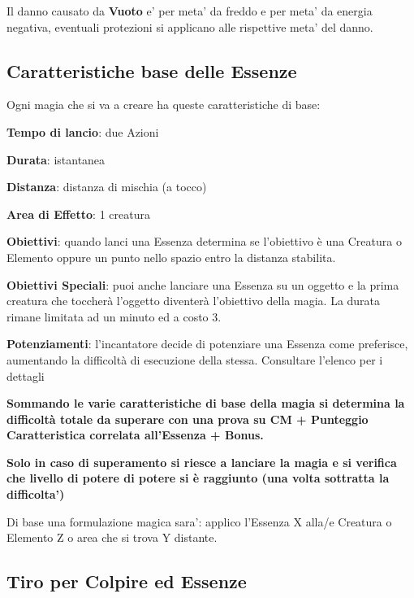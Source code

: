 \documentclass[a4paper,11pt,twoside,openany]{book}
\begin{document}
Il danno causato da \textbf{Vuoto} e' per meta' da freddo e per meta' da energia negativa, eventuali protezioni si applicano alle rispettive meta' del danno.

\subsection{Caratteristiche base delle Essenze}

\label{caratteristiche-base-delle-essenze}

Ogni magia che si va a creare ha queste caratteristiche di base:

\smallskip

\textbf{Tempo di lancio}: due Azioni

\textbf{Durata}: istantanea

\textbf{Distanza}: distanza di mischia (a tocco)

\textbf{Area di Effetto}: 1 creatura 

\textbf{Obiettivi}: quando lanci una Essenza determina se l'obiettivo è una Creatura o Elemento oppure un punto nello spazio entro la distanza stabilita.

\textbf{Obiettivi Speciali}: puoi anche lanciare una Essenza su un oggetto e la prima creatura che toccherà l'oggetto diventerà l'obiettivo della magia. La durata rimane limitata ad un minuto ed a costo 3.

\textbf{Potenziamenti}: l'incantatore decide di potenziare una Essenza come preferisce, aumentando la difficoltà di esecuzione della stessa. Consultare l'elenco per i dettagli

\textbf{Sommando le varie caratteristiche di base della magia si determina la difficoltà totale da superare con una prova su CM + Punteggio Caratteristica correlata all'Essenza + Bonus.}

\textbf{Solo in caso di superamento si riesce a lanciare la magia e si verifica che livello di potere di potere si è raggiunto (una volta sottratta la difficolta')}

Di base una formulazione magica sara': applico l'Essenza X alla/e Creatura o Elemento Z o area che si trova Y distante.

\subsection{Tiro per Colpire ed Essenze}
\end{document}
